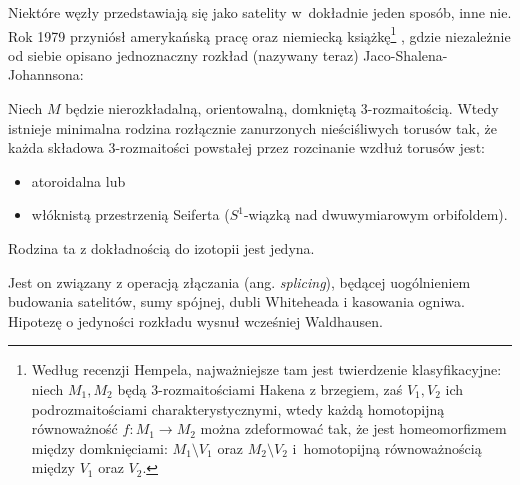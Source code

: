 Niektóre węzły przedstawiają się jako satelity w~dokładnie jeden sposób, inne nie.
Rok 1979 przyniósł amerykańską pracę \cite{jaco1979} oraz niemiecką książkę\footnote{Według recenzji Hempela, najważniejsze tam jest twierdzenie klasyfikacyjne: niech $M_1, M_2$ będą 3-rozmaitościami Hakena  z brzegiem, zaś $V_1, V_2$ ich podrozmaitościami charakterystycznymi, wtedy każdą homotopijną równoważność $f \colon M_1 \to M_2$ można zdeformować tak, że jest homeomorfizmem między domknięciami: $M_1 \setminus V_1$ oraz $M_2 \setminus V_2$ i~homotopijną równoważnością między $V_1$ oraz $V_2$.} \cite{johannson1979}, gdzie niezależnie od siebie opisano jednoznaczny rozkład (nazywany teraz) Jaco-Shalena-Johannsona:
%
%
%
%

\begin{proposition}
    Niech $M$ będzie nierozkładalną, orientowalną, domkniętą 3-rozmaitością.
    Wtedy istnieje minimalna rodzina rozłącznie zanurzonych nieściśliwych torusów tak, że każda składowa 3-rozmaitości powstałej przez rozcinanie wzdłuż torusów jest:
    \begin{itemize}
        \item atoroidalna lub
    \item włóknistą przestrzenią Seiferta ($S^1$-wiązką nad dwuwymiarowym orbifoldem).    \end{itemize}
%
%
%
%
%
    Rodzina ta z dokładnością do izotopii jest jedyna.
\end{proposition}

Jest on związany z operacją złączania (ang. \emph{splicing}), będącej uogólnieniem budowania satelitów, sumy spójnej, dubli Whiteheada i kasowania ogniwa.
%
Hipotezę o jedyności rozkładu wysnuł wcześniej Waldhausen.
%



